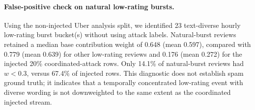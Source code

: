 \paragraph{False-positive check on natural low-rating bursts.} Using the non-injected Uber analysis split, we identified 23 text-diverse hourly low-rating burst bucket(s) without using attack labels. Natural-burst reviews retained a median base contribution weight of 0.648 (mean 0.597), compared with 0.779 (mean 0.639) for other low-rating reviews and 0.176 (mean 0.272) for the injected 20\% coordinated-attack rows. Only 14.1\% of natural-burst reviews had $w<0.3$, versus 67.4\% of injected rows. This diagnostic does not establish spam ground truth; it indicates that a temporally concentrated low-rating event with diverse wording is not downweighted to the same extent as the coordinated injected stream.
